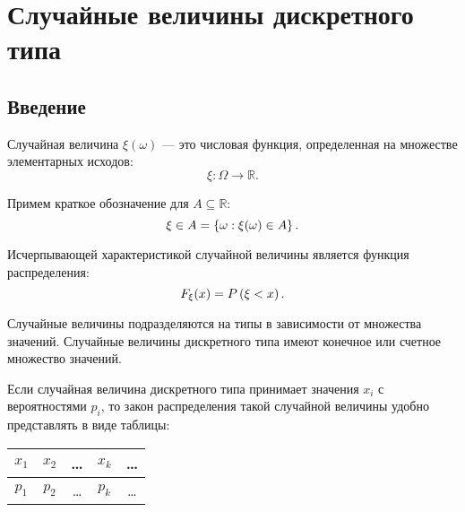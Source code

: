 \chapter{Случайные величины дискретного типа}

\section*{Введение}

Случайная величина $\xi(\omega)$ --- это числовая функция, определенная на множестве элементарных исходов:
\begin{equation}
    \xi : \Omega \rightarrow \mathbb{R}.
\end{equation}

Примем краткое обозначение для $A \subseteq \mathbb{R}$:
\begin{equation}
    \xi \in A = \left \{ \omega : \xi(\omega) \in A \right \}.
\end{equation}

Исчерпывающей характеристикой случайной величины является функция распределения:
\begin{equation}
    F_\xi(x) = P \left ( \xi < x \right ).
\end{equation}

Случайные величины подразделяются на типы в зависимости от множества значений. Случайные величины дискретного типа имеют конечное или счетное множество значений.

Если случайная величина дискретного типа принимает значения $x_i$ с вероятностями $p_i$, то закон распределения такой случайной величины удобно представлять в виде таблицы:
\begin{center}
    \begin{tabular}{|c|c|c|c|c|}
        \hline
        $x_1$ & $x_2$ & \dots & $x_k$ & \dots \\
        \hline
        $p_1$ & $p_2$ & \dots & $p_k$ & \dots \\
        \hline
    \end{tabular}
\end{center}

